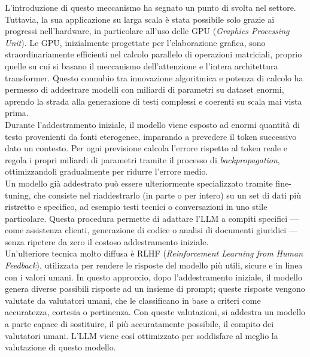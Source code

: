 L'introduzione di questo meccanismo ha segnato un punto di svolta nel settore. Tuttavia, la sua applicazione su larga scala è stata possibile solo grazie ai progressi nell'hardware, in particolare all'uso delle GPU (\textit{Graphics Processing Unit}). Le GPU, inizialmente progettate per l'elaborazione grafica, sono straordinariamente efficienti nel calcolo parallelo di operazioni matriciali, proprio quelle su cui si basano il meccanismo dell'attenzione e l'intera architettura transformer. Questo connubio tra innovazione algoritmica e potenza di calcolo ha permesso di addestrare modelli con miliardi di parametri su dataset enormi, aprendo la strada alla generazione di testi complessi e coerenti su scala mai vista prima. \\
Durante l'addestramento iniziale, il modello viene esposto ad enormi quantità di testo provenienti da fonti eterogenee, imparando a prevedere il token successivo dato un contesto. Per ogni previsione calcola l'errore rispetto al token reale e regola i propri miliardi di parametri tramite il processo di \textit{backpropagation}, ottimizzandoli gradualmente per ridurre l'errore medio. \\
Un modello già addestrato può essere ulteriormente specializzato tramite fine-tuning, che consiste nel riaddestrarlo (in parte o per intero) su un set di dati più ristretto e specifico, ad esempio testi tecnici o conversazioni in uno stile particolare. Questa procedura permette di adattare l'LLM a compiti specifici — come assistenza clienti, generazione di codice o analisi di documenti giuridici — senza ripetere da zero il costoso addestramento iniziale. \\
Un'ulteriore tecnica molto diffusa è RLHF (\textit{Reinforcement Learning from Human Feedback}), utilizzata per rendere le risposte del modello più utili, sicure e in linea con i valori umani. In questo approccio, dopo l'addestramento iniziale, il modello genera diverse possibili risposte ad un insieme di prompt; queste risposte vengono valutate da valutatori umani, che le classificano in base a criteri come accuratezza, cortesia o pertinenza. Con queste valutazioni, si addestra un modello a parte capace di sostituire, il più accuratamente possibile, il compito dei valutatori umani. L'LLM viene così ottimizzato per soddisfare al meglio la valutazione di questo modello.

